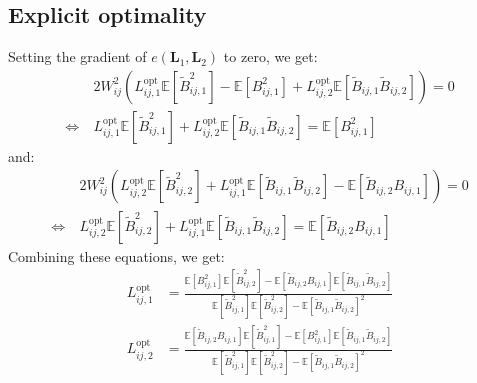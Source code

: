 \documentclass[12pt]{scrartcl}
\begin{document}
\subsection{Explicit optimality}
Setting the gradient of $e(\mathbf{L}_1,\mathbf{L}_2)$ to zero, we get:
\begin{align}
\label{eq:de_th_1}
& 2 W_{ij}^2 \left(L_{ij,1}^\mathrm{opt} \mathbb{E}\left[\widetilde{B}_{ij,1}^2\right] - \mathbb{E} \left[B^2_{ij,1}\right] + L_{ij,2}^\mathrm{opt} \mathbb{E} \left[\widetilde{B}_{ij,1} \widetilde{B}_{ij,2}\right] \right) = 0 \nonumber \\
\Leftrightarrow \ & L_{ij,1}^\mathrm{opt} \mathbb{E}\left[\widetilde{B}_{ij,1}^2\right] + L_{ij,2}^\mathrm{opt} \mathbb{E} \left[\widetilde{B}_{ij,1} \widetilde{B}_{ij,2}\right] = \mathbb{E} \left[B^2_{ij,1}\right]
\end{align}
and:
\begin{align}
\label{eq:de_th_2}
& 2 W_{ij}^2 \left(L_{ij,2}^\mathrm{opt} \mathbb{E}\left[\widetilde{B}_{ij,2}^2\right] + L_{ij,1}^\mathrm{opt} \mathbb{E} \left[\widetilde{B}_{ij,1} \widetilde{B}_{ij,2}\right] - \mathbb{E} \left[\widetilde{B}_{ij,2} B_{ij,1}\right] \right) = 0 \nonumber \\
\Leftrightarrow \ & L_{ij,2}^\mathrm{opt} \mathbb{E}\left[\widetilde{B}_{ij,2}^2\right] + L_{ij,1}^\mathrm{opt} \mathbb{E} \left[\widetilde{B}_{ij,1} \widetilde{B}_{ij,2}\right] = \mathbb{E} \left[\widetilde{B}_{ij,2} B_{ij,1}\right]
\end{align}
Combining these equations, we get:
\begin{subequations}
\label{eq:de_th}
\begin{align}
L_{ij,1}^\mathrm{opt} & = \frac{\mathbb{E} \left[B^2_{ij,1}\right] \mathbb{E} \left[\widetilde{B}_{ij,2}^2\right] - \mathbb{E} \left[\widetilde{B}_{ij,2} B_{ij,1}\right] \mathbb{E} \left[\widetilde{B}_{ij,1} \widetilde{B}_{ij,2}\right] }{\mathbb{E} \left[\widetilde{B}_{ij,1}^2\right] \mathbb{E} \left[\widetilde{B}_{ij,2}^2\right] - \mathbb{E} \left[\widetilde{B}_{ij,1} \widetilde{B}_{ij,2}\right]^2} \\
L_{ij,2}^\mathrm{opt} & = \frac{\mathbb{E} \left[\widetilde{B}_{ij,2} B_{ij,1}\right] \mathbb{E} \left[\widetilde{B}_{ij,1}^2\right] - \mathbb{E} \left[B^2_{ij,1}\right] \mathbb{E} \left[\widetilde{B}_{ij,1} \widetilde{B}_{ij,2}\right]}{\mathbb{E} \left[\widetilde{B}_{ij,1}^2\right] \mathbb{E} \left[\widetilde{B}_{ij,2}^2\right] - \mathbb{E} \left[\widetilde{B}_{ij,1} \widetilde{B}_{ij,2}\right]^2}
\end{align}
\end{subequations}
\end{document}
